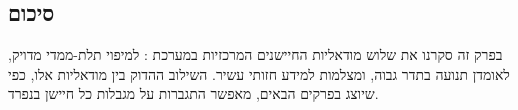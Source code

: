 \subsection{סיכום}
\label{subsec:sensors_summary}

בפרק זה סקרנו את שלוש מודאליות החיישנים המרכזיות במערכת
:  למיפוי תלת-ממדי מדויק,
 לאומדן תנועה בתדר גבוה, ומצלמות למידע חזותי עשיר.
השילוב ההדוק בין מודאליות אלו, כפי שיוצג בפרקים הבאים,
מאפשר התגברות על מגבלות כל חיישן בנפרד.